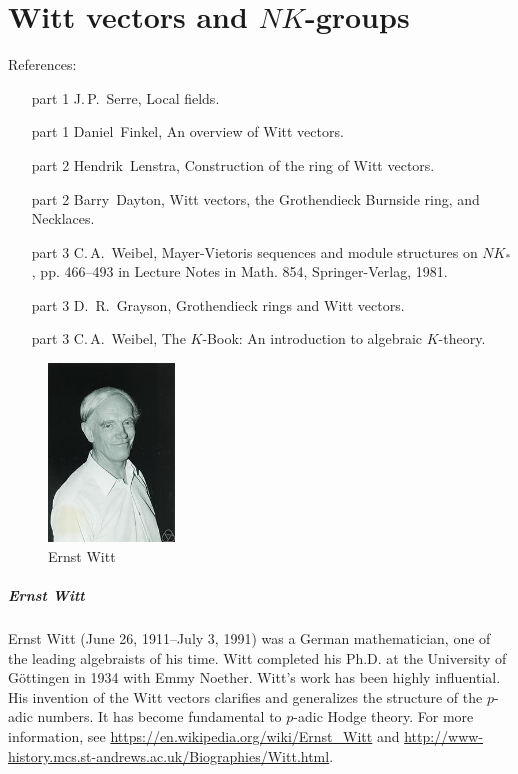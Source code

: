 \chapter{Witt vectors and $NK$-groups}
References:
\begin{itemize}
    \item[part 1] J.\,P.\ Serre, Local fields.
    \item[part 1] Daniel\ Finkel, An overview of Witt vectors.
    \item[part 2] Hendrik\ Lenstra, Construction of the ring of Witt vectors.
    \item[part 2] Barry\ Dayton, Witt vectors, the Grothendieck Burnside ring, and Necklaces.
	\item[part 3] C.\,A.\ Weibel, Mayer-Vietoris sequences and module structures on $NK_*$, pp. 466–493 in Lecture Notes in Math. 854, Springer-Verlag, 1981.
	\item[part 3] D.\, R.\ Grayson, Grothendieck rings and Witt vectors.
	\item[part 3] C.\,A.\ Weibel, The $K$-Book: An introduction to algebraic $K$-theory.
\end{itemize}
\begin{figure}[htbp]
	\centering
	\includegraphics[width=0.3\textwidth]{./figures/Witt}
	\caption{Ernst Witt}
\end{figure}
\paragraph{Ernst Witt} %
\label{par:ernst_witt}
Ernst Witt (June 26, 1911--July 3, 1991) was a German mathematician, one of the leading algebraists of his time. Witt completed his Ph.D. at the University of G\"{o}ttingen in 1934 with Emmy Noether. Witt's work has been highly influential. His invention of the Witt vectors clarifies and generalizes the structure of the $p$-adic numbers. It has become fundamental to $p$-adic Hodge theory. For more information, see \url{https://en.wikipedia.org/wiki/Ernst_Witt} and \url{http://www-history.mcs.st-andrews.ac.uk/Biographies/Witt.html}.

